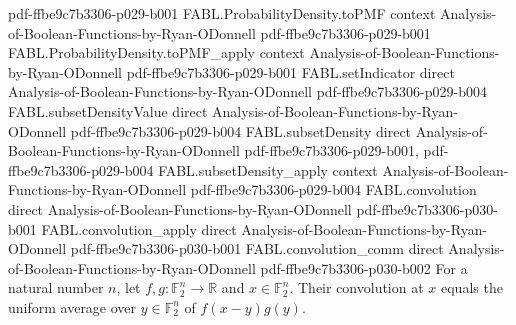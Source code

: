 \begin{theorem}
  {pdf-ffbe9c7b3306-p029-b001}
\proofstep
  {FABL.ProbabilityDensity.toPMF}
  {context}
  {Analysis-of-Boolean-Functions-by-Ryan-ODonnell}
  {pdf-ffbe9c7b3306-p029-b001}
\proofstep
  {FABL.ProbabilityDensity.toPMF_apply}
  {context}
  {Analysis-of-Boolean-Functions-by-Ryan-ODonnell}
  {pdf-ffbe9c7b3306-p029-b001}
\proofstep
  {FABL.setIndicator}
  {direct}
  {Analysis-of-Boolean-Functions-by-Ryan-ODonnell}
  {pdf-ffbe9c7b3306-p029-b004}
\proofstep
  {FABL.subsetDensityValue}
  {direct}
  {Analysis-of-Boolean-Functions-by-Ryan-ODonnell}
  {pdf-ffbe9c7b3306-p029-b004}
\proofstep
  {FABL.subsetDensity}
  {direct}
  {Analysis-of-Boolean-Functions-by-Ryan-ODonnell}
  {pdf-ffbe9c7b3306-p029-b001,
    pdf-ffbe9c7b3306-p029-b004}
\proofstep
  {FABL.subsetDensity_apply}
  {context}
  {Analysis-of-Boolean-Functions-by-Ryan-ODonnell}
  {pdf-ffbe9c7b3306-p029-b004}
\proofstep
  {FABL.convolution}
  {direct}
  {Analysis-of-Boolean-Functions-by-Ryan-ODonnell}
  {pdf-ffbe9c7b3306-p030-b001}
\proofstep
  {FABL.convolution_apply}
  {direct}
  {Analysis-of-Boolean-Functions-by-Ryan-ODonnell}
  {pdf-ffbe9c7b3306-p030-b001}
\proofstep
  {FABL.convolution_comm}
  {direct}
  {Analysis-of-Boolean-Functions-by-Ryan-ODonnell}
  {pdf-ffbe9c7b3306-p030-b002}
For a natural number $n$, let $f,g:\mathbb{F}_2^n\to\mathbb{R}$ and
$x\in\mathbb{F}_2^n$. Their convolution at $x$ equals the uniform average over
$y\in\mathbb{F}_2^n$ of $f(x-y)g(y)$.
\end{theorem}

